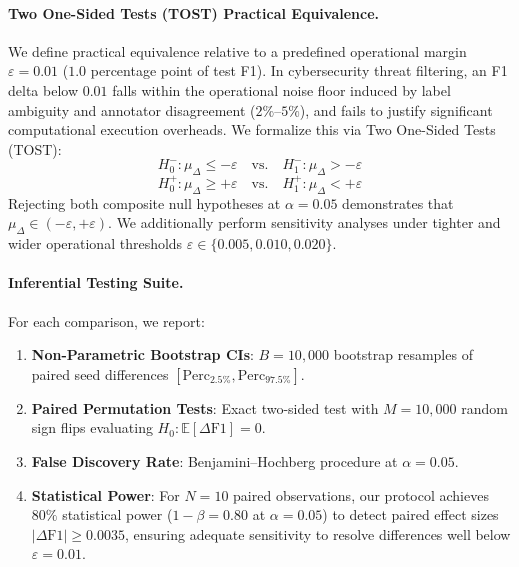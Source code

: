 \documentclass[10pt,twocolumn,letterpaper]{article}
\begin{document}
\paragraph{Two One-Sided Tests (TOST) Practical Equivalence.} We define practical equivalence relative to a predefined operational margin $\varepsilon = 0.01$ ($1.0$ percentage point of test F1). In cybersecurity threat filtering, an F1 delta below $0.01$ falls within the operational noise floor induced by label ambiguity and annotator disagreement ($2\%\text{--}5\%$), and fails to justify significant computational execution overheads. We formalize this via Two One-Sided Tests (TOST):
\begin{equation}
H_0^-: \mu_\Delta \le -\varepsilon \quad \text{vs.} \quad H_1^-: \mu_\Delta > -\varepsilon
\end{equation}
\begin{equation}
H_0^+: \mu_\Delta \ge +\varepsilon \quad \text{vs.} \quad H_1^+: \mu_\Delta < +\varepsilon
\end{equation}
Rejecting both composite null hypotheses at $\alpha = 0.05$ demonstrates that $\mu_\Delta \in (-\varepsilon, +\varepsilon)$. We additionally perform sensitivity analyses under tighter and wider operational thresholds $\varepsilon \in \{0.005, 0.010, 0.020\}$.

\paragraph{Inferential Testing Suite.} For each comparison, we report:
\begin{enumerate}
    \item \textbf{Non-Parametric Bootstrap CIs}: $B = 10,000$ bootstrap resamples of paired seed differences $[\text{Perc}_{2.5\%}, \text{Perc}_{97.5\%}]$.
    \item \textbf{Paired Permutation Tests}: Exact two-sided test with $M = 10,000$ random sign flips evaluating $H_0: \mathbb{E}[\Delta\text{F1}] = 0$.
    \item \textbf{False Discovery Rate}: Benjamini--Hochberg procedure at $\alpha = 0.05$.
    \item \textbf{Statistical Power}: For $N=10$ paired observations, our protocol achieves $80\%$ statistical power ($1-\beta=0.80$ at $\alpha=0.05$) to detect paired effect sizes $|\Delta\text{F1}| \ge 0.0035$, ensuring adequate sensitivity to resolve differences well below $\varepsilon = 0.01$.
\end{enumerate}
\end{document}
